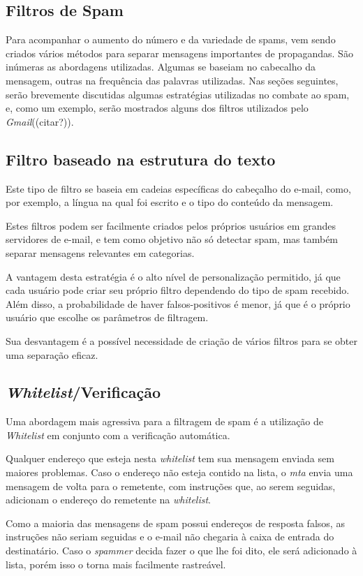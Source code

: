 \documentclass[a4paper,dvipdfm]{article}
\begin{document}
\begin{description}
\section{Filtros de Spam}
	Para acompanhar o aumento do número e da variedade de spams, vem sendo criados vários métodos para separar mensagens importantes de propagandas.
	São inúmeras as abordagens utilizadas. 
	Algumas se baseiam no \gls{cabecalho} da mensagem, outras na frequência das palavras utilizadas.
	Nas seções seguintes, serão brevemente discutidas algumas estratégias utilizadas no combate ao spam, e, como um exemplo, serão mostrados alguns dos filtros utilizados pelo \emph{Gmail}((citar?)).

	\subsection{Filtro baseado na estrutura do texto}
		Este tipo de filtro se baseia em cadeias específicas do cabeçalho do e-mail, como, por exemplo, a língua na qual foi escrito e o tipo do conteúdo da mensagem.

		Estes filtros podem ser facilmente criados pelos próprios usuários em grandes servidores de e-mail, e tem como objetivo não só detectar spam, mas também separar mensagens relevantes em categorias.

		A vantagem desta estratégia é o alto nível de personalização permitido, já que cada usuário pode criar seu próprio filtro dependendo do tipo de spam recebido. 
		Além disso, a probabilidade de haver falsos-positivos é menor, já que é o próprio usuário que escolhe os parâmetros de filtragem.
		
		Sua desvantagem é a possível necessidade de criação de vários filtros para se obter uma separação eficaz.


	\subsection{\emph{Whitelist}/Verificação}
		Uma abordagem mais agressiva para a filtragem de spam é a utilização de \emph{Whitelist} em conjunto com a verificação automática.

		Qualquer endereço que esteja nesta \emph{whitelist} tem sua mensagem enviada sem maiores problemas.
		Caso o endereço não esteja contido na lista, o \emph{\gls{mta}} envia uma mensagem de volta para o remetente, com instruções que, ao serem seguidas, adicionam o endereço do remetente na \emph{whitelist}.

		Como a maioria das mensagens de spam possui endereços de resposta falsos, as instruções não seriam seguidas e o e-mail não chegaria à caixa de entrada do destinatário.
		Caso o \emph{spammer} decida fazer o que lhe foi dito, ele será adicionado à lista, porém isso o torna mais facilmente rastreável.
		

\end{description}
\end{document}
